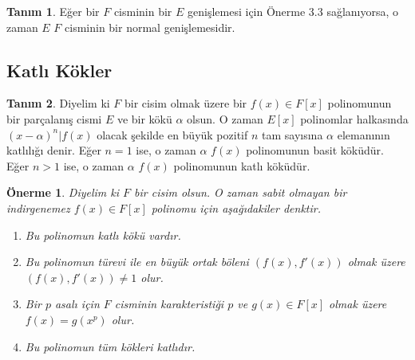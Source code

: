 \documentclass[draft]{article}
\newtheorem{prop}[thm]{Önerme}
\theoremstyle{definition}
\newtheorem{defn}{Tanım}[section]
\theoremstyle{remark}
\begin{document}
    	    \begin{defn}
    	        Eğer bir $F$ cisminin bir $E$ genişlemesi için Önerme 3.3 sağlanıyorsa, o zaman $E$ $F$ cisminin bir normal genişlemesidir.
    	    \end{defn}
	        
    	\subsection{Katlı Kökler}
    	
    	    \begin{defn}
    	        Diyelim ki $F$ bir cisim olmak üzere bir $f(x) \in F[x]$ polinomunun bir parçalanış cismi $E$ ve bir kökü $\alpha$ olsun. O zaman $E[x]$ polinomlar halkasında $(x - \alpha)^n | f(x)$ olacak şekilde en büyük pozitif $n$ tam sayısına $\alpha$ elemanının katlılığı denir. Eğer $n = 1$ ise, o zaman $\alpha$ $f(x)$ polinomunun basit köküdür. Eğer $n > 1$ ise, o zaman $\alpha$ $f(x)$ polinomunun katlı köküdür.
    	    \end{defn}
    	    
    	    \begin{prop}
    	        Diyelim ki $F$ bir cisim olsun. O zaman sabit olmayan bir indirgenemez $f(x) \in F[x]$ polinomu için aşağıdakiler denktir.
    	        \begin{enumerate}
				\renewcommand{\labelenumi}{(\roman{enumi})}
				    \item Bu polinomun katlı kökü vardır.
				    \item Bu polinomun türevi ile en büyük ortak böleni $(f(x), f'(x))$ olmak üzere $(f(x), f'(x)) \neq 1$ olur.
				    \item Bir $p$ asalı için $F$ cisminin karakteristiği $p$ ve $g(x) \in F[x]$ olmak üzere $f(x) = g(x^p)$ olur.
				    \item Bu polinomun tüm kökleri katlıdır.
				\end{enumerate}
    	    \end{prop}
    	    
\end{document}
